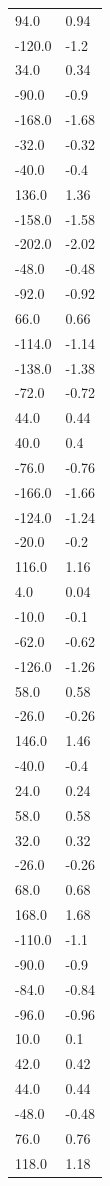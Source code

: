 \begin{longtable}{ll}
94.0 & 0.94 \\
-120.0 & -1.2 \\
34.0 & 0.34 \\
-90.0 & -0.9 \\
-168.0 & -1.68 \\
-32.0 & -0.32 \\
-40.0 & -0.4 \\
136.0 & 1.36 \\
-158.0 & -1.58 \\
-202.0 & -2.02 \\
-48.0 & -0.48 \\
-92.0 & -0.92 \\
66.0 & 0.66 \\
-114.0 & -1.14 \\
-138.0 & -1.38 \\
-72.0 & -0.72 \\
44.0 & 0.44 \\
40.0 & 0.4 \\
-76.0 & -0.76 \\
-166.0 & -1.66 \\
-124.0 & -1.24 \\
-20.0 & -0.2 \\
116.0 & 1.16 \\
4.0 & 0.04 \\
-10.0 & -0.1 \\
-62.0 & -0.62 \\
-126.0 & -1.26 \\
58.0 & 0.58 \\
-26.0 & -0.26 \\
146.0 & 1.46 \\
-40.0 & -0.4 \\
24.0 & 0.24 \\
58.0 & 0.58 \\
32.0 & 0.32 \\
-26.0 & -0.26 \\
68.0 & 0.68 \\
168.0 & 1.68 \\
-110.0 & -1.1 \\
-90.0 & -0.9 \\
-84.0 & -0.84 \\
-96.0 & -0.96 \\
10.0 & 0.1 \\
42.0 & 0.42 \\
44.0 & 0.44 \\
-48.0 & -0.48 \\
76.0 & 0.76 \\
118.0 & 1.18 \\

\end{longtable}
